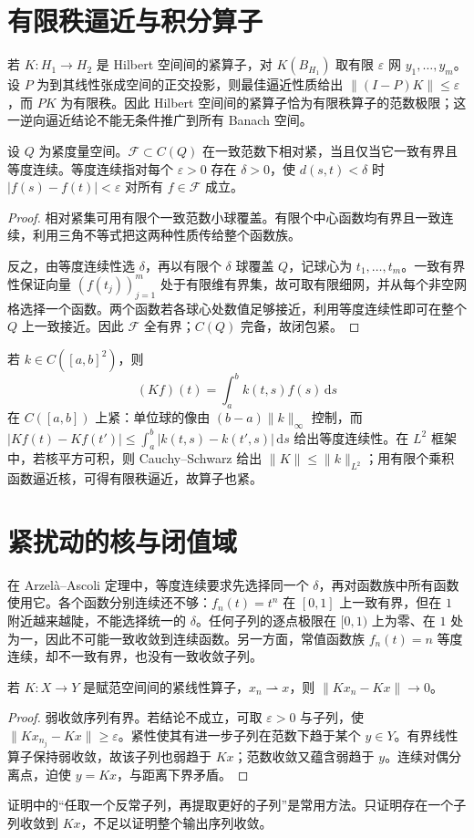 \documentclass[UTF8,12pt,a4paper,fontset=fandol]{ctexbook}
\begin{document}
\section{有限秩逼近与积分算子}
若 $K:H_1\to H_2$ 是 Hilbert 空间间的紧算子，对 $K(B_{H_1})$ 取有限 $\varepsilon$ 网 $y_1,\ldots,y_m$。设 $P$ 为到其线性张成空间的正交投影，则最佳逼近性质给出 $\|(I-P)K\|\leq\varepsilon$，而 $PK$ 为有限秩。因此 Hilbert 空间间的紧算子恰为有限秩算子的范数极限；这一逆向逼近结论不能无条件推广到所有 Banach 空间。

\begin{theorem}\label{thm:fa-ascoli}
设 $Q$ 为紧度量空间。$\mathcal F\subset C(Q)$ 在一致范数下相对紧，当且仅当它一致有界且等度连续。等度连续指对每个 $\varepsilon>0$ 存在 $\delta>0$，使 $d(s,t)<\delta$ 时 $|f(s)-f(t)|<\varepsilon$ 对所有 $f\in\mathcal F$ 成立。
\end{theorem}
\begin{proof}
相对紧集可用有限个一致范数小球覆盖。有限个中心函数均有界且一致连续，利用三角不等式把这两种性质传给整个函数族。

反之，由等度连续性选 $\delta$，再以有限个 $\delta$ 球覆盖 $Q$，记球心为 $t_1,\ldots,t_m$。一致有界性保证向量 $(f(t_j))_{j=1}^m$ 处于有限维有界集，故可取有限细网，并从每个非空网格选择一个函数。两个函数若各球心处数值足够接近，利用等度连续性即可在整个 $Q$ 上一致接近。因此 $\mathcal F$ 全有界；$C(Q)$ 完备，故闭包紧。
\end{proof}
若 $k\in C([a,b]^2)$，则
\[
 (Kf)(t)=\int_a^b k(t,s)f(s)\,\mathrm ds
\]
在 $C([a,b])$ 上紧：单位球的像由 $(b-a)\|k\|_\infty$ 控制，而 $|Kf(t)-Kf(t')|\leq\int_a^b|k(t,s)-k(t',s)|\,\mathrm ds$ 给出等度连续性。在 $L^2$ 框架中，若核平方可积，则 Cauchy--Schwarz 给出 $\|K\|\leq\|k\|_{L^2}$；用有限个乘积函数逼近核，可得有限秩逼近，故算子也紧。

\section{紧扰动的核与闭值域}
在 Arzelà--Ascoli 定理中，等度连续要求先选择同一个 $\delta$，再对函数族中所有函数使用它。各个函数分别连续还不够：$f_n(t)=t^n$ 在 $[0,1]$ 上一致有界，但在 $1$ 附近越来越陡，不能选择统一的 $\delta$。任何子列的逐点极限在 $[0,1)$ 上为零、在 $1$ 处为一，因此不可能一致收敛到连续函数。另一方面，常值函数族 $f_n(t)=n$ 等度连续，却不一致有界，也没有一致收敛子列。

\begin{proposition}[紧算子把弱收敛变为范数收敛]\label{prop:fa-compact-weak-strong}
若 $K:X\to Y$ 是赋范空间间的紧线性算子，$x_n\rightharpoonup x$，则 $\|Kx_n-Kx\|\to0$。
\end{proposition}
\begin{proof}
弱收敛序列有界。若结论不成立，可取 $\varepsilon>0$ 与子列，使 $\|Kx_{n_j}-Kx\|\geq\varepsilon$。紧性使其有进一步子列在范数下趋于某个 $y\in Y$。有界线性算子保持弱收敛，故该子列也弱趋于 $Kx$；范数收敛又蕴含弱趋于 $y$。连续对偶分离点，迫使 $y=Kx$，与距离下界矛盾。
\end{proof}
证明中的“任取一个反常子列，再提取更好的子列”是常用方法。只证明存在一个子列收敛到 $Kx$，不足以证明整个输出序列收敛。
\end{document}
